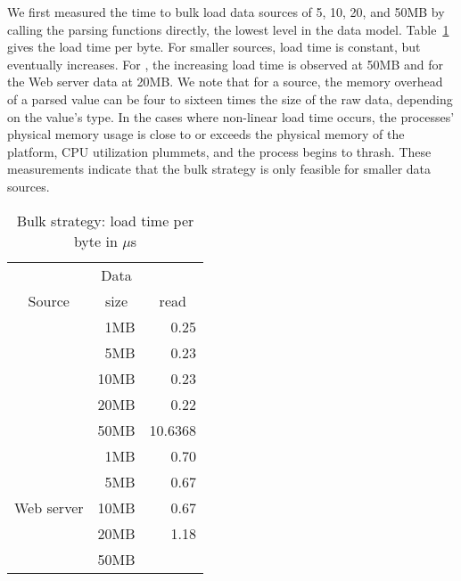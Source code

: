 We first measured the time to bulk load data sources of 5, 10, 20, and
50MB by calling the \pads{} parsing functions directly,
\ie{} the lowest level in the \padx{} data model.
Table~\ref{tab:bulk} gives the load time per byte.  For smaller
sources, load time is constant, but eventually increases.
For \dibbler{}, the increasing load time is observed at 50MB and for
the Web server data at 20MB.  We note that for a \pads{} source, the
memory overhead of a \pads{} parsed value can be four to sixteen times
the size of the raw data, depending on the value's type.  In the cases
where non-linear load time occurs, the processes' physical memory usage
is close to or exceeds the physical memory of the platform, CPU
utilization plummets, and the process begins to thrash.  These
measurements indicate that the bulk strategy is only feasible for
smaller data sources.
\begin{table}
\begin{center}
\begin{tabular}{c|r|r}
           & \multicolumn{1}{c|}{Data}  & \multicolumn{1}{c}{\pads{}} \\
Source     & \multicolumn{1}{c|}{size}  & \multicolumn{1}{c}{read} \\ \hline

           &  1MB  & 0.25\\
           &  5MB  & 0.23\\
\dibbler{} & 10MB  & 0.23\\
           & 20MB  & 0.22\\
           & 50MB  & 10.6368  \\ \hline 
           &  1MB  & 0.70\\
           &  5MB  & 0.67\\
Web server & 10MB  & 0.67\\
           & 20MB  & 1.18\\ %
           & 50MB  &     \\ 

\end{tabular}
\end{center}
\caption{Bulk strategy: load time per byte in $\mu$s}
\label{tab:bulk}
\end{table}


